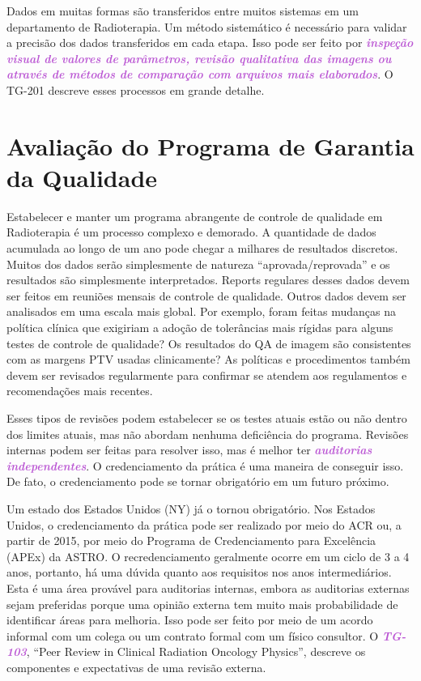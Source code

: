 \documentclass[11pt,a4paper]{article}
\newcounter{exemplo}
\begin{document}
	Dados em muitas formas são transferidos entre muitos sistemas em um departamento de Radioterapia. Um método sistemático é necessário para validar a precisão dos dados transferidos em cada etapa. Isso pode ser feito por \textcolor{MediumOrchid}{\textbf{\textit{inspeção visual de valores de parâmetros, revisão qualitativa das imagens ou através de métodos de comparação com arquivos mais elaborados}}}. O TG-201 descreve esses processos em grande detalhe.

\section{Avaliação do Programa de Garantia da Qualidade}

	Estabelecer e manter um programa abrangente de controle de qualidade em Radioterapia é um processo complexo e demorado. A quantidade de dados acumulada ao longo de um ano pode chegar a milhares de resultados discretos. Muitos dos dados serão simplesmente de natureza ``aprovada/reprovada'' e os resultados são simplesmente interpretados. Reports regulares desses dados devem ser feitos em reuniões mensais de controle de qualidade. Outros dados devem ser analisados em uma escala mais global. Por exemplo, foram feitas mudanças na política clínica que exigiriam a adoção de tolerâncias mais rígidas para alguns testes de controle de qualidade? Os resultados do QA de imagem são consistentes com as margens PTV usadas clinicamente? As políticas e procedimentos também devem ser revisados regularmente para confirmar se atendem aos regulamentos e recomendações mais recentes.

	Esses tipos de revisões podem estabelecer se os testes atuais estão ou não dentro dos limites atuais, mas não abordam nenhuma deficiência do programa. Revisões internas podem ser feitas para resolver isso, mas é melhor ter \textcolor{MediumOrchid}{\textbf{\textit{auditorias independentes}}}. O credenciamento da prática é uma maneira de conseguir isso. De fato, o credenciamento pode se tornar obrigatório em um futuro próximo. 

	Um estado dos Estados Unidos (NY) já o tornou obrigatório. Nos Estados Unidos, o credenciamento da prática pode ser realizado por meio do ACR ou, a partir de 2015, por meio do Programa de Credenciamento para Excelência (APEx) da ASTRO. O recredenciamento geralmente ocorre em um ciclo de 3 a 4 anos, portanto, há uma dúvida quanto aos requisitos nos anos intermediários. Esta é uma área provável para auditorias internas, embora as auditorias externas sejam preferidas porque uma opinião externa tem muito mais probabilidade de identificar áreas para melhoria. Isso pode ser feito por meio de um acordo informal com um colega ou um contrato formal com um físico consultor. O \textcolor{MediumOrchid}{\textbf{\textit{TG-103}}}, ``Peer Review in Clinical Radiation Oncology Physics'', descreve os componentes e expectativas de uma revisão externa.
\end{document}
